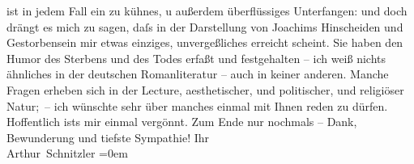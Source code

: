 \begin{ledgroupsized}[t]{13cm}
               ist in jedem Fall ein zu kühnes, u außerdem überflüssiges Unterfangen: und doch
               drängt es mich zu sagen, daſs in der Darstellung von Joachims Hinscheiden und Gestorbensein mir etwas einziges,
               unvergeßliches erreicht scheint. Sie haben den Humor des Sterbens und des Todes
               erfaßt und festgehalten – ich weiß nichts ähnliches in der deutschen Romanliteratur –
               auch in keiner anderen.\pend
           \pstart
           Manche Fragen erheben sich in der Lecture, aesthetischer, und politischer, und
               religiöser Natur; – ich wünschte sehr über manches einmal mit Ihnen reden zu dürfen.
               Hoffentlich ists mir einmal vergönnt. Zum Ende nur nochmals – Dank, Bewunderung und
               tiefste Sympathie!\pend
           \pstart
           Ihr{\\[\baselineskip]}\spacefill\mbox{Arthur Schnitzler}\pend
           \leftskip=0em{}\endnumbering{}\end{ledgroupsized}  \newcommand{\dateiname}{L02429}\newcommand{\titel}{Arthur Schnitzler an Thomas Mann, 5. 1. 1925}\newcommand{\editorInnen}{Martin Anton Müller und Gerd-Hermann Susen}
      